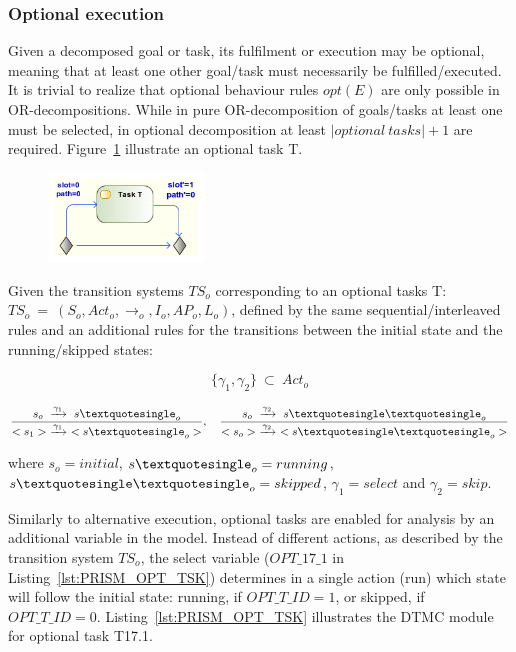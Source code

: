 \subsubsection{Optional execution}

Given a decomposed goal or task, its fulfilment or execution may be optional, meaning that at least one other goal/task must necessarily be fulfilled/executed. It is trivial to realize that optional behaviour rules $opt(E)$ are only possible in OR-decompositions. While in pure OR-decomposition of goals/tasks at least one must be selected, in optional decomposition at least $|optional\ tasks| + 1$ are required. Figure~\ref{fig:UML_OPT_TSK} illustrate an optional task T.

\begin{figure}[ht!]
\centering
\includegraphics[width=0.37\textwidth]{imgs/UML_OPT_TSK.png}
\caption{}
\label{fig:UML_OPT_TSK}
\end{figure}

Given the transition systems $TS_o$ corresponding to an optional tasks T: $TS_o\ =\ (S_o, Act_o, \rightarrow_o, I_o, AP_o, L_o)$, defined by the same sequential/interleaved rules and an additional rules for the transitions between the initial state and the running/skipped states:

$$\{\gamma_1,\gamma_2\}\ \subset\ Act_o$$

$$\frac{s_o\ \xrightarrow{\gamma_1}\ s\textquotesingle_o}{<s_1>\ \xrightarrow{\gamma_1}\ <s\textquotesingle_o>},\quad \frac{s_o\ \xrightarrow{\gamma_2}\ s\textquotesingle\textquotesingle_o}{<s_o>\ \xrightarrow{\gamma_2}\ <s\textquotesingle\textquotesingle_o>}$$
\medskip

\noindent
where $s_o = initial$, $s\textquotesingle_o = running$, $s\textquotesingle\textquotesingle_o = skipped$, $\gamma_1 = select$ and $\gamma_2 = skip$.
\medskip

Similarly to alternative execution, optional tasks are enabled for analysis by an additional variable in the model. Instead of different actions, as described by the transition system $TS_o$, the select variable ($OPT\_17\_1$ in Listing~\ref{lst:PRISM_OPT_TSK}) determines in a single action (run) which state will follow the initial state: running, if $OPT\_T\_ID=1$, or skipped, if $OPT\_T\_ID=0$. Listing~\ref{lst:PRISM_OPT_TSK} illustrates the DTMC module for optional task T17.1. 
\medskip

